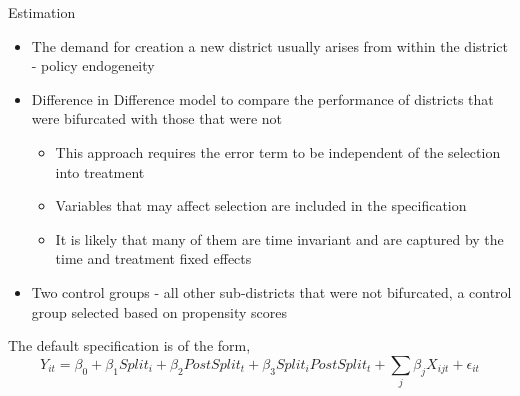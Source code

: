 \documentclass{beamer}
\begin{document}
		\begin{frame}{Estimation}
			\begin{itemize}
				\item The demand for creation a new district usually arises from within the district - policy endogeneity
				\item Difference in Difference model to compare the performance of districts that were bifurcated with those that were not
				\begin{itemize}
					\item This approach requires the error term to be independent of the selection into treatment
					\item Variables that may affect selection are included in the specification
					\item It is likely that many of them are time invariant and are captured by the time and treatment fixed effects
				\end{itemize}
				\item Two control groups - all other sub-districts that were not bifurcated, a control group selected based on propensity scores
			\end{itemize}
			
			The default specification is of the form,
			\[ Y_{it} = \beta_0 + \beta_1 Split_{i} + \beta_2 PostSplit_t + \beta_3 Split_i PostSplit_t + \sum_j \beta_j X_{ijt} + \epsilon_{it} \]
			
		\end{frame}
		
		
		
\end{document}
